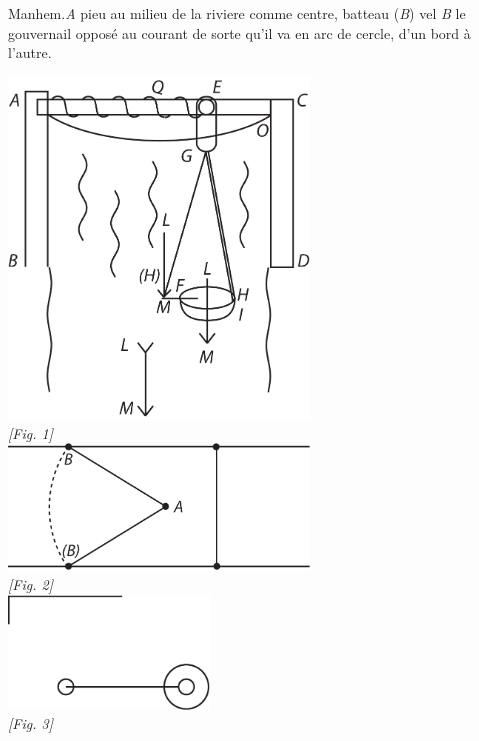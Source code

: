 Manhem\protect{}.\pend \pstart \textit{A} pieu au milieu de la riviere comme centre, batteau\protect{} (\textit{B}) vel \textit{B} le gouvernail oppos\'{e} au courant de sorte qu'il va en arc de cercle, d'un bord \`{a} l'autre.\pend \vspace{3.0ex}
 \begin{center}
  \includegraphics[width=0.6\textwidth]{images/38_87r1}
   \vspace{0.5ex}
   \\\textit{[Fig. 1]} \\
  \newpage
  \includegraphics[width=0.6\textwidth]{images/38_87r2}
  \vspace{0.5ex}
   \\\textit{[Fig. 2]} \\
   \vspace{10mm}
  \includegraphics[width=0.4\textwidth]{images/38_87r3}
  \vspace{0.5ex}
   \\\textit{[Fig. 3]} \\

\end{center}
